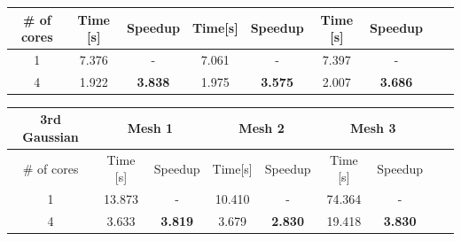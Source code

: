 \documentclass[8pt]{beamer}
\begin{document}
\begin{frame}
\begin{footnotesize}
\begin{center}
\begin{tabular}{|c|c|c|c|c|c|c|c|c|}
    \hline
    \# of cores & Time [s] & Speedup & Time[s] & Speedup & Time [s] & Speedup \\
    \hline
    1 & 7.376 & - & 7.061 & - & 7.397 & - \\
    4 & 1.922 & \textbf{3.838} & 1.975 & \textbf{3.575} & 2.007 & \textbf{3.686} \\
    \hline
\end{tabular}
\end{center}
\begin{center}
\begin{tabular}{|c|c|c|c|c|c|c|c|c|} 
   \hline
    \textbf{3rd Gaussian}& \multicolumn{2}{|c|}{Mesh 1} & \multicolumn{2}{|c|}{Mesh 2} & \multicolumn{2}{|c|}{Mesh 3}\\
    \hline
    \# of cores & Time [s] & Speedup & Time[s] & Speedup & Time [s] & Speedup \\
    \hline
    1 & 13.873 & - & 10.410 & - & 74.364 & - \\
    4 & 3.633 & \textbf{3.819} & 3.679 & \textbf{2.830} & 19.418 & \textbf{3.830} \\
    \hline
\end{tabular}
\end{center}
\end{footnotesize}
\end{frame}
\end{document}
